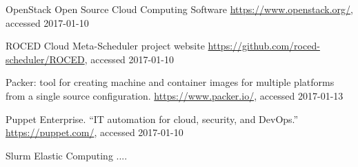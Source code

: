 \begin{thebibliography}{}
%
%
OpenStack Open Source Cloud Computing Software
\url{https://www.openstack.org/}, accessed 2017-01-10

ROCED Cloud Meta-Scheduler project website
\url{https://github.com/roced-scheduler/ROCED}, accessed 2017-01-10


Packer: tool for creating machine and container images for multiple platforms from a single source configuration. 
\url{https://www.packer.io/}, accessed 2017-01-13


Puppet Enterprise. ``IT automation for cloud, security, and DevOps.''
\url{https://puppet.com/}, accessed 2017-01-10

Slurm Elastic Computing ....
\end{thebibliography}



